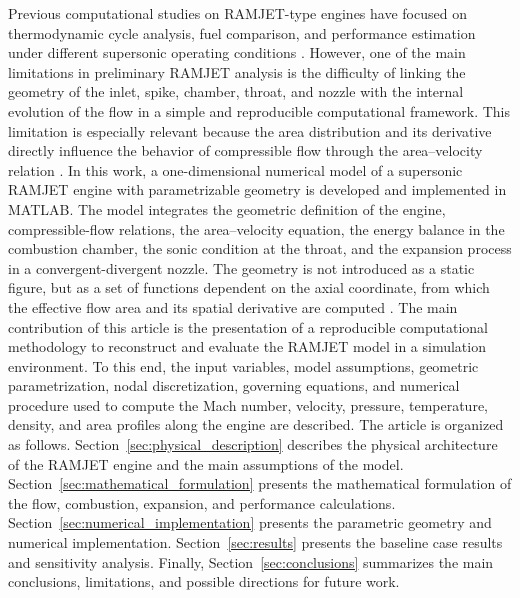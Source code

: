 \documentclass[preprint,12pt]{elsarticle}
\begin{document}
Previous computational studies on RAMJET-type engines have focused on thermodynamic cycle analysis, fuel comparison, and performance estimation under different supersonic operating conditions \cite{Dallos2024}. However, one of the main limitations in preliminary RAMJET analysis is the difficulty of linking the geometry of the inlet, spike, chamber, throat, and nozzle with the internal evolution of the flow in a simple and reproducible computational framework. This limitation is especially relevant because the area distribution and its derivative directly influence the behavior of compressible flow through the area--velocity relation \cite{Anderson1990,Mattingly2006}.
In this work, a one-dimensional numerical model of a supersonic RAMJET engine with parametrizable geometry is developed and implemented in MATLAB. The model integrates the geometric definition of the engine, compressible-flow relations, the area--velocity equation, the energy balance in the combustion chamber, the sonic condition at the throat, and the expansion process in a convergent-divergent nozzle. The geometry is not introduced as a static figure, but as a set of functions dependent on the axial coordinate, from which the effective flow area and its spatial derivative are computed \cite{Cadavid2025}.
The main contribution of this article is the presentation of a reproducible computational methodology to reconstruct and evaluate the RAMJET model in a simulation environment. To this end, the input variables, model assumptions, geometric parametrization, nodal discretization, governing equations, and numerical procedure used to compute the Mach number, velocity, pressure, temperature, density, and area profiles along the engine are described.
The article is organized as follows. Section~\ref{sec:physical_description} describes the physical architecture of the RAMJET engine and the main assumptions of the model. Section~\ref{sec:mathematical_formulation} presents the mathematical formulation of the flow, combustion, expansion, and performance calculations. Section~\ref{sec:numerical_implementation} presents the parametric geometry and numerical implementation. Section~\ref{sec:results} presents the baseline case results and sensitivity analysis. Finally, Section~\ref{sec:conclusions} summarizes the main conclusions, limitations, and possible directions for future work.
\end{document}
